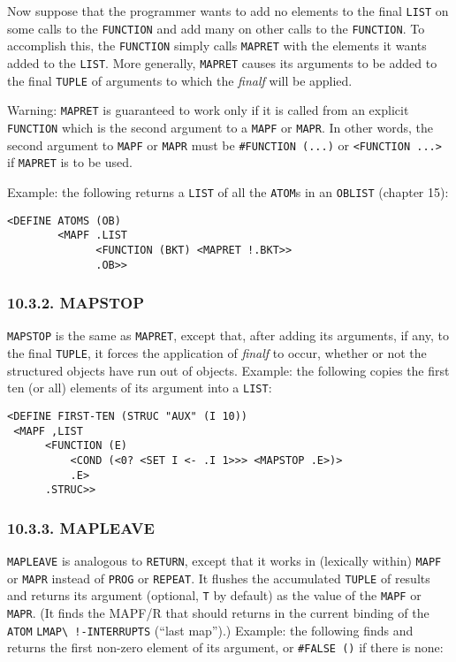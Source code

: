 \documentclass[a4paper,]{article}
\begin{document}
Now suppose that the programmer wants to add no elements to the final \texttt{LIST} on some calls to the \texttt{FUNCTION}
and add many on other calls to the \texttt{FUNCTION}. To accomplish this, the \texttt{FUNCTION} simply calls
\texttt{MAPRET} with the elements it wants added to the \texttt{LIST}. More generally, \texttt{MAPRET} causes its arguments
to be added to the final \texttt{TUPLE} of arguments to which the \emph{finalf} will be applied.

Warning: \texttt{MAPRET} is guaranteed to work only if it is called from an explicit \texttt{FUNCTION} which is the second
argument to a \texttt{MAPF} or \texttt{MAPR}. In other words, the second argument to \texttt{MAPF} or \texttt{MAPR} must be
\texttt{\#FUNCTION\ (...)} or \texttt{\textless{}FUNCTION\ ...\textgreater{}} if \texttt{MAPRET} is to be used.

Example: the following returns a \texttt{LIST} of all the \texttt{ATOM}s in an \texttt{OBLIST} (chapter 15):

\begin{verbatim}
<DEFINE ATOMS (OB)
        <MAPF .LIST
              <FUNCTION (BKT) <MAPRET !.BKT>>
              .OB>>
\end{verbatim}

\subsubsection{10.3.2. MAPSTOP}\label{mapstop}

\texttt{MAPSTOP}  is the same as \texttt{MAPRET}, except that, after adding its arguments,
if any, to the final \texttt{TUPLE}, it forces the application of \emph{finalf} to occur, whether or not the structured
objects have run out of objects. Example: the following copies the first ten (or all) elements of its argument into a
\texttt{LIST}:

\begin{verbatim}
<DEFINE FIRST-TEN (STRUC "AUX" (I 10))
 <MAPF ,LIST
      <FUNCTION (E)
          <COND (<0? <SET I <- .I 1>>> <MAPSTOP .E>)>
          .E>
      .STRUC>>
\end{verbatim}

\subsubsection{10.3.3. MAPLEAVE}\label{mapleave}

\texttt{MAPLEAVE}  is analogous to \texttt{RETURN}, except that it works in (lexically
within) \texttt{MAPF} or \texttt{MAPR} instead of \texttt{PROG} or \texttt{REPEAT}. It flushes the accumulated
\texttt{TUPLE} of results and returns its argument (optional, \texttt{T} by default) as the value of the \texttt{MAPF} or
\texttt{MAPR}. (It finds the MAPF/R that should returns in the current binding of the \texttt{ATOM}
\texttt{LMAP\textbackslash{}\ !-INTERRUPTS}  (``last map'').) Example: the
following finds and returns the first non-zero element of its argument, or \texttt{\#FALSE\ ()} if there is none:
\end{document}
